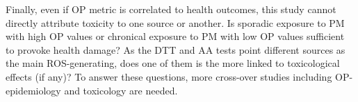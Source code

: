 \documentclass[acp, manuscript]{copernicus}
\begin{document}
Finally, even if OP metric is correlated to health outcomes, this study
cannot directly attribute toxicity to one source or another. Is sporadic
exposure to PM with high OP values or chronical exposure to PM with low OP
values sufficient to provoke health damage?  As the DTT and AA tests point
different sources as the main ROS-generating, does one of them is the more
linked to toxicological effects (if any)? To answer these questions, more
cross-over studies including OP-epidemiology and toxicology are needed.






















%
%
%



\end{document}
